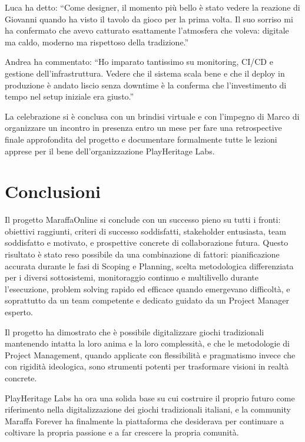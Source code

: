 Luca ha detto: ``Come designer, il momento più bello è stato vedere la reazione di Giovanni quando ha visto il tavolo da gioco per la prima volta. Il suo sorriso mi ha confermato che avevo catturato esattamente l'atmosfera che voleva: digitale ma caldo, moderno ma rispettoso della tradizione.''

Andrea ha commentato: ``Ho imparato tantissimo su monitoring, CI/CD e gestione dell'infrastruttura. Vedere che il sistema scala bene e che il deploy in produzione è andato liscio senza downtime è la conferma che l'investimento di tempo nel setup iniziale era giusto.''

La celebrazione si è conclusa con un brindisi virtuale e con l'impegno di Marco di organizzare un incontro in presenza entro un mese per fare una retrospective finale approfondita del progetto e documentare formalmente tutte le lezioni apprese per il bene dell'organizzazione PlayHeritage Labs.

\section{Conclusioni}

Il progetto MaraffaOnline si conclude con un successo pieno su tutti i fronti: obiettivi raggiunti, criteri di successo soddisfatti, stakeholder entusiasta, team soddisfatto e motivato, e prospettive concrete di collaborazione futura. Questo risultato è stato reso possibile da una combinazione di fattori: pianificazione accurata durante le fasi di Scoping e Planning, scelta metodologica differenziata per i diversi sottosistemi, monitoraggio continuo e multilivello durante l'esecuzione, problem solving rapido ed efficace quando emergevano difficoltà, e soprattutto da un team competente e dedicato guidato da un Project Manager esperto.

Il progetto ha dimostrato che è possibile digitalizzare giochi tradizionali mantenendo intatta la loro anima e la loro complessità, e che le metodologie di Project Management, quando applicate con flessibilità e pragmatismo invece che con rigidità ideologica, sono strumenti potenti per trasformare visioni in realtà concrete.

PlayHeritage Labs ha ora una solida base su cui costruire il proprio futuro come riferimento nella digitalizzazione dei giochi tradizionali italiani, e la community Maraffa Forever ha finalmente la piattaforma che desiderava per continuare a coltivare la propria passione e a far crescere la propria comunità.

